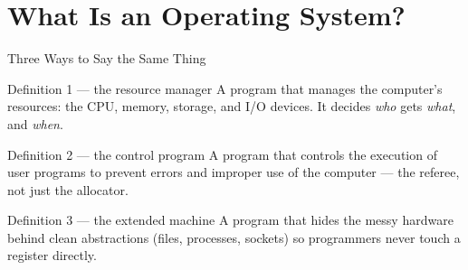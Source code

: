\documentclass[aspectratio=169]{beamer}
\begin{document}

\section{What Is an Operating System?}

\begin{frame}{Three Ways to Say the Same Thing}
  \begin{block}{Definition 1 --- the resource manager}
    A program that manages the computer's resources: the CPU, memory, storage,
    and I/O devices. It decides \emph{who} gets \emph{what}, and \emph{when}.
  \end{block}
  \begin{block}{Definition 2 --- the control program}
    A program that controls the execution of user programs to prevent errors
    and improper use of the computer --- the referee, not just the allocator.
  \end{block}
  \begin{block}{Definition 3 --- the extended machine}
    A program that hides the messy hardware behind clean abstractions
    (files, processes, sockets) so programmers never touch a register directly.
  \end{block}
  \vspace{0.15cm}
\end{frame}
\end{document}
